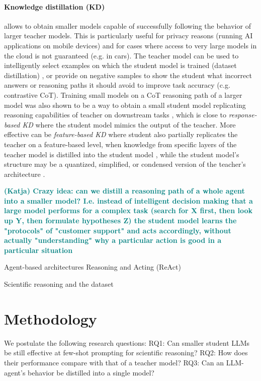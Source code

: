 \documentclass{article}
\newcommand{\katja}[1]{\textbf{\textcolor{teal}{(Katja) #1}}}
\begin{document}
\paragraph{Knowledge distillation (KD)} allows to obtain smaller models capable of successfully following the behavior of larger teacher models. This is particularly useful for privacy reasons (running AI applications on mobile devices) and for cases where access to very large models in the cloud is not guaranteed (e.g. in cars). The teacher model can be used to intelligently select examples on which the student model is trained (dataset distillation) \cite{yu2023dataset}, or provide on negative samples to show the student what incorrect answers or reasoning paths it should avoid to improve task accuracy  \cite{li2024turning} (c.g. contrastive CoT). Training small models on a CoT reasoning path of a larger model was also shown to be a way to obtain a small student model replicating reasoning capabilities of teacher on downstream tasks \cite{magister2022teaching}, which is close to \textit{response-based KD} where the student model mimics the output of the teacher. More effective can be \textit{feature-based KD} where student also partially replicates the teacher on a feature-based level, when knowledge from specific layers of the teacher model is distilled into the student model \cite{sepahvand2022teacher}, while the student model's structure may be a quantized, simplified, or condensed version of the teacher's architecture \cite{gou2021knowledge}. 

\katja{Crazy idea: can we distill a reasoning path of a whole agent into a smaller model? I.e. instead of intelligent decision making that a large model performs for a complex task (search for X first, then look up Y, then formulate hypotheses Z) the student model learns the "protocols" of "customer support" and acts accordingly, without actually "understanding" why a particular action is good in a particular situation}

Agent-based architectures \cite{lin2024swiftsage} \cite{ghafarollahi2024sciagents}
Reasoning and Acting (ReAct) 

Scientific reasoning and the dataset \cite{lu2022learn}

\section{Methodology}
We postulate the following research questions: 
RQ1: Can smaller student LLMs be still effective at few-shot prompting for scientific reasoning?
RQ2: How does their performance compare with that of a teacher model?
RQ3: Can an LLM-agent's behavior be distilled into a single model?
\end{document}
